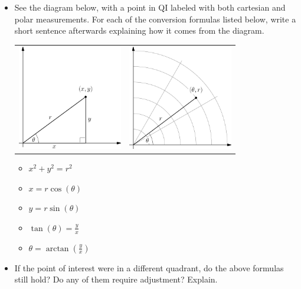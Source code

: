 \begin{exercise}{ \Coffeecup \Coffeecup \Coffeecup}\label{convertingPolar}
\begin{itemize}
\item See the diagram below, with a point in QI labeled with both cartesian and polar measurements.  For each of the conversion formulas listed below, write a short sentence afterwards explaining how it comes from the diagram.
	\begin{center}
	\begin{tabular}{c c}
    \includegraphics[width=130pt]{ChapterCalcIII/Figures/QITri.eps} &
    \includegraphics[width=130pt]{ChapterCalcIII/Figures/QIPolar.eps}
	\end{tabular}
    \end{center}

\begin{itemize}
\item $x^2+y^2=r^2$
\item $x=r\cos(\theta)$
\item $y=r\sin(\theta)$
\item $\tan(\theta)=\frac{y}{x}$
\item $\theta = \arctan\left(\frac{y}{x}\right)$
\end{itemize} 

\item If the point of interest were in a different quadrant, do the above formulas still hold?  Do any of them require adjustment?  Explain.
\vspace*{1in}
\end{itemize}
\end{exercise}

